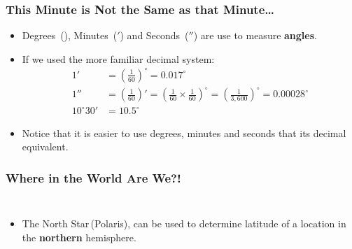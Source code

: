 \begin{frame}
\frametitle{This Minute is Not the Same as that Minute\ldots}
\medskip
{}

\begin{itemize}
\item Degrees~(\degree), Minutes~($'$) and Seconds~($''$) are use to measure \textbf{angles}.
\item If we used the more familiar decimal system:
%
{\small\begin{align*}
	1' &= \left(\frac{1}{60}\right)^\circ = 0.017^\circ\\
	1'' &= \left(\frac{1}{60}\right)'=\left(\frac{1}{60}\times\frac{1}{60}\right)^\circ = \left(\frac{1}{3,600}\right)^\circ = 0.00028^\circ\\
	10^\circ 30' &= 10.5^\circ
	\end{align*}}
%
\item Notice that it is easier to use degrees, minutes and seconds that its decimal equivalent.
\end{itemize}
\end{frame}

\begin{frame}
\frametitle{Where in the World Are We?!}
\medskip
\begin{columns}[b]
\begin{itemize} 
\item The North Star\,(Polaris), can be used to determine latitude of a location in the \textbf{northern} hemisphere.
\end{itemize}


\end{columns}
\end{frame}

